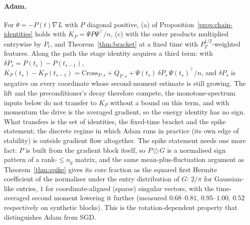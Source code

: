 \paragraph{Adam.} For $\dot\theta=-P(t)\nabla L$ with $P$ diagonal positive, (a)
of Proposition~\ref{prop:chain-identities} holds with $K_P=\Psi P\Psi^{\!\top}/n$,
(c) with the outer products multiplied entrywise by $P_\ell$, and
Theorem~\ref{thm:bracket} at a fixed time with $P_T^{1/2}$-weighted features.
Along the path the stage identity acquires a third term: with
$\delta P_s=P(t_s)-P(t_{s-1})$,
$K_P(t_s)-K_P(t_{s-1})=\mathrm{Cross}_{P,s}+Q_{P,s}+\Psi(t_s)\,\delta P_s\,\Psi(t_s)^{\!\top}/n$,
and $\delta P_s$ is negative on every coordinate whose second-moment estimate
is still growing. The lift and the preconditioner's decay therefore compete,
the monotone-spectrum inputs below do not transfer to $K_P$ without a bound
on this term, and with momentum the drive is the averaged gradient, so the
energy identity has no sign. What transfers is the set of identities, the
fixed-time bracket and the spike statement; the discrete regime in which Adam
runs in practice (its own edge of stability) is outside gradient flow
altogether. The spike statement needs one more fact: $P$ is
built from the gradient block itself, so $P\odot G$ is a normalised sign
pattern of a rank-$\le n_y$ matrix, and the same mean-plus-fluctuation
argument as Theorem~\ref{thm:spike} gives its core fraction as the squared first
Hermite coefficient of the normaliser under the entry distribution of $G$:
$2/\pi$ for Gaussian-like entries, $1$ for coordinate-aligned (sparse) singular
vectors, with the time-averaged second moment lowering it further (measured
$0.68$--$0.81$, $0.95$--$1.00$, $0.52$ respectively on synthetic blocks). This
is the rotation-dependent property that distinguishes Adam from SGD.

